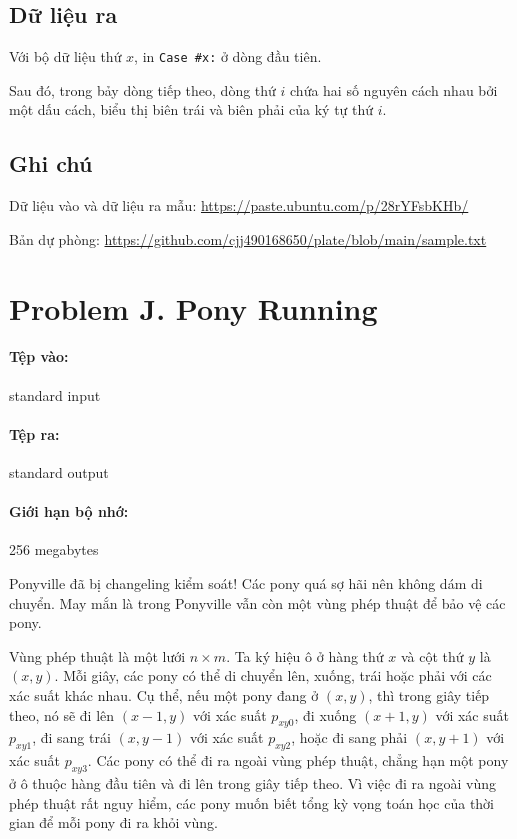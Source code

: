 \documentclass[11pt]{article}
\begin{document}
\subsection*{Dữ liệu ra}

Với bộ dữ liệu thứ \(x\), in \texttt{Case \#x:} ở dòng đầu tiên.

Sau đó, trong bảy dòng tiếp theo, dòng thứ \(i\) chứa hai số nguyên cách nhau
bởi một dấu cách, biểu thị biên trái và biên phải của ký tự thứ \(i\).

\subsection*{Ghi chú}

Dữ liệu vào và dữ liệu ra mẫu:
\url{https://paste.ubuntu.com/p/28rYFsbKHb/}

Bản dự phòng:
\url{https://github.com/cjj490168650/plate/blob/main/sample.txt}

\section{Problem J. Pony Running}

\paragraph{Tệp vào:} standard input
\paragraph{Tệp ra:} standard output
\paragraph{Giới hạn bộ nhớ:} 256 megabytes

Ponyville đã bị changeling kiểm soát! Các pony quá sợ hãi nên không dám di
chuyển. May mắn là trong Ponyville vẫn còn một vùng phép thuật để bảo vệ các
pony.

Vùng phép thuật là một lưới \(n\times m\). Ta ký hiệu ô ở hàng thứ \(x\) và
cột thứ \(y\) là \((x,y)\). Mỗi giây, các pony có thể di chuyển lên, xuống,
trái hoặc phải với các xác suất khác nhau. Cụ thể, nếu một pony đang ở
\((x,y)\), thì trong giây tiếp theo, nó sẽ đi lên \((x-1,y)\) với xác suất
\(p_{xy0}\), đi xuống \((x+1,y)\) với xác suất \(p_{xy1}\), đi sang trái
\((x,y-1)\) với xác suất \(p_{xy2}\), hoặc đi sang phải \((x,y+1)\) với xác
suất \(p_{xy3}\). Các pony có thể đi ra ngoài vùng phép thuật, chẳng hạn một
pony ở ô thuộc hàng đầu tiên và đi lên trong giây tiếp theo. Vì việc đi ra
ngoài vùng phép thuật rất nguy hiểm, các pony muốn biết tổng kỳ vọng toán học
của thời gian để mỗi pony đi ra khỏi vùng.
\end{document}
